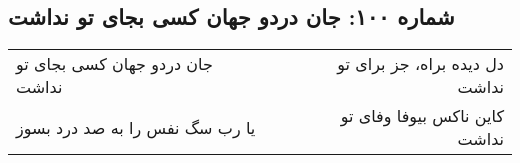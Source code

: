 \begin{center}
\section*{شماره ۱۰۰: جان دردو جهان کسی بجای تو نداشت}
\label{sec:100}
\begin{longtable}{l p{0.5cm} r}
جان دردو جهان کسی بجای تو نداشت
&&
دل دیده براه، جز برای تو نداشت
\\
یا رب سگ نفس را به صد درد بسوز
&&
کاین ناکس بیوفا وفای تو نداشت
\\
\end{longtable}
\end{center}
